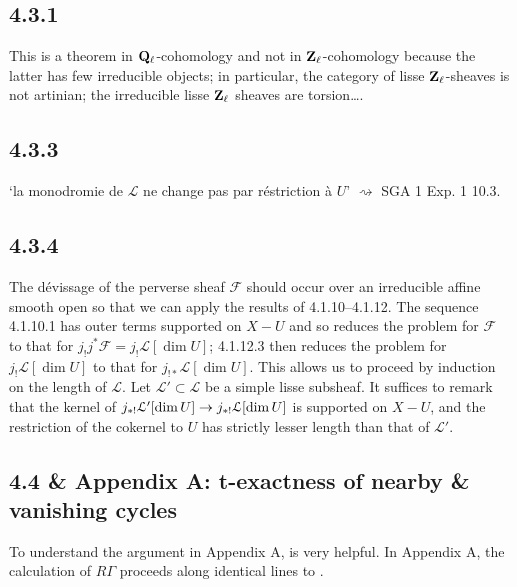 \documentclass[deligne.tex]{subfiles}
\begin{document}
\subsection*{4.3.1} This is a theorem in $\mathbf{Q}_\ell$-cohomology and not in
$\mathbf{Z}_\ell$-cohomology because the latter has few irreducible objects; in
particular, the category of lisse $\mathbf{Z}_\ell$-sheaves is not artinian;
the irreducible lisse $\mathbf{Z}_\ell$ sheaves are torsion….

\subsection*{4.3.3} `la monodromie de $\mathcal L$ ne change pas par
réstriction à $U$' $\rightsquigarrow$ SGA 1 Exp. 1 10.3.

\subsection*{4.3.4} The dévissage of the perverse sheaf $\mathcal F$ should
occur over an irreducible affine smooth open so that we can apply the
results of 4.1.10--4.1.12. The sequence 4.1.10.1 has outer terms supported
on $X-U$ and so reduces the problem for $\mathcal F$ to that for
$j_!j^*\mathcal F=j_!\mathcal L[\dim U]$; 4.1.12.3 then reduces
the problem for $j_!\mathcal L[\dim U]$ to that for
$j_{!*}\mathcal L[\dim U]$. This allows us to proceed by induction on the
length of $\mathcal L$. Let $\mathcal L'\subset\mathcal L$ be a simple
lisse subsheaf. It suffices to remark that the kernel of
$j_{*!}\mathcal L'[\dim U]\rightarrow j_{*!}\mathcal L[\dim U]$ is supported on
$X-U$, and the restriction of the cokernel to $U$ has strictly lesser 
length than that of $\mathcal L'$.

\subsection*{4.4 \& Appendix A: t-exactness of nearby \& vanishing cycles}
\label{BBD:AppendixA}
To understand the argument in Appendix A, \cite[\S3.1]{Illusie} is very
helpful.
In Appendix A, the calculation of $R\Gamma$ proceeds along identical lines
to \cite[7.11.3 \& 10.7]{Modular}.
\end{document}
